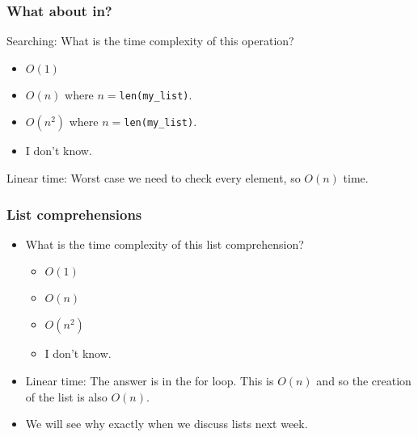\begin{frame}
	\frametitle{What about in?}
	Searching:
			What is the time complexity of this operation?
			\begin{itemize}
				\item $O(1)$
				\item $O(n)$ where $n = $\texttt{len(my\_list)}.
				\item $O(n^2)$ where $n = $\texttt{len(my\_list)}.
				\item I don't know.
			\end{itemize}
			
Linear time:	Worst case we need to check every element, so $O(n)$ time.

			

\end{frame}

\begin{frame}
	\frametitle{List comprehensions}

	\begin{itemize}
\item 
			What is the time complexity of this list comprehension?
			\begin{itemize}
				\item $O(1)$
				\item $O(n)$ 
				\item $O(n^2)$
				\item I don't know.
			\end{itemize}
\item Linear time:
		The answer is in the for loop. This is $O(n)$ and so the creation of the list is also $O(n)$. 
\item We will see why exactly when we discuss lists next week.
		\end{itemize}	
		

		
\end{frame}

